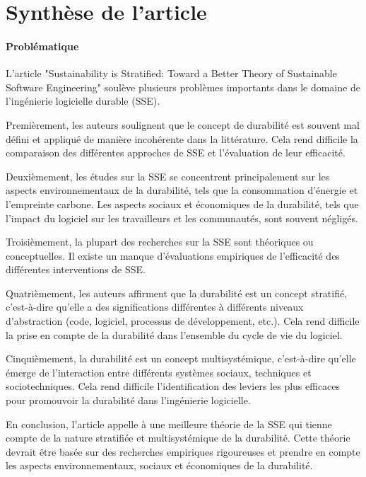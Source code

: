 \section{Synthèse de l'article}

\paragraph{Problématique}
L'article "Sustainability is Stratified: Toward a Better Theory of Sustainable Software Engineering" soulève plusieurs problèmes importants dans le domaine de l'ingénierie logicielle durable (SSE).

Premièrement, les auteurs soulignent que le concept de durabilité est souvent mal défini et appliqué de manière incohérente dans la littérature. Cela rend difficile la comparaison des différentes approches de SSE et l'évaluation de leur efficacité.

Deuxièmement, les études sur la SSE se concentrent principalement sur les aspects environnementaux de la durabilité, tels que la consommation d'énergie et l'empreinte carbone. Les aspects sociaux et économiques de la durabilité, tels que l'impact du logiciel sur les travailleurs et les communautés, sont souvent négligés.

Troisièmement, la plupart des recherches sur la SSE sont théoriques ou conceptuelles. Il existe un manque d'évaluations empiriques de l'efficacité des différentes interventions de SSE.

Quatrièmement, les auteurs affirment que la durabilité est un concept stratifié, c'est-à-dire qu'elle a des significations différentes à différents niveaux d'abstraction (code, logiciel, processus de développement, etc.). Cela rend difficile la prise en compte de la durabilité dans l'ensemble du cycle de vie du logiciel.

Cinquièmement, la durabilité est un concept multisystémique, c'est-à-dire qu'elle émerge de l'interaction entre différents systèmes sociaux, techniques et sociotechniques. Cela rend difficile l'identification des leviers les plus efficaces pour promouvoir la durabilité dans l'ingénierie logicielle.

En conclusion, l'article appelle à une meilleure théorie de la SSE qui tienne compte de la nature stratifiée et multisystémique de la durabilité. Cette théorie devrait être basée sur des recherches empiriques rigoureuses et prendre en compte les aspects environnementaux, sociaux et économiques de la durabilité.

